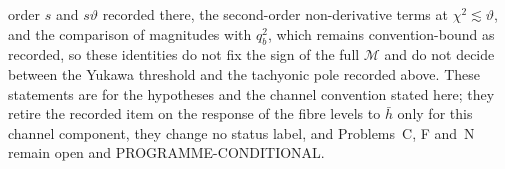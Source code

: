 order \(s\) and \(s\vartheta\) recorded there, the second-order non-derivative terms at \(\chi^2\lesssim\vartheta\), and the comparison of magnitudes with \(q_b^2\), which remains convention-bound as recorded, so these identities do not fix the sign of the full \(\mathcal M\) and do not decide between the Yukawa threshold and the tachyonic pole recorded above. These statements are for the hypotheses and the channel convention stated here; they retire the recorded item on the response of the fibre levels to \(\bar h\) only for this channel component, they change no status label, and Problems~C, F and~N remain open and PROGRAMME-CONDITIONAL.

